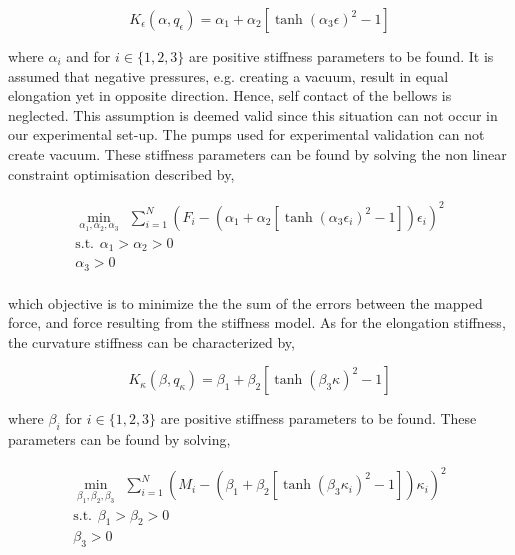 \begin{equation}
    K_\epsilon(\alpha,q_\epsilon) =  \alpha_1 + \alpha_2 [\tanh({\alpha_3 \epsilon})^2 -1]
\end{equation}


where $\alpha_i$ and  for $i \in \{1,2,3\} $ are positive stiffness parameters to be found. It is assumed that negative pressures, e.g. creating a vacuum, result in equal elongation yet in opposite direction. Hence, self contact of the bellows is neglected. This assumption is deemed valid since this situation can not occur in our experimental set-up. The pumps used for experimental validation can not create vacuum. These stiffness parameters can be found by solving the non linear constraint optimisation described by,


\begin{equation}
\begin{aligned}
\min_{\alpha_1,\alpha_2,\alpha_3} \hspace{5pt} \sum_{i=1}^{N}(F_i -  (\alpha_1 + \alpha_2 [\tanh({\alpha_3 \epsilon_i})^2 -1])\epsilon_i)^2    \\ 
\text{s.t.} \hspace{5pt} \alpha_1 > \alpha_2 > 0 \\
\alpha_3 > 0 \\ 
\label{eq3:Keopt}
\end{aligned}
\end{equation}

which objective is to minimize the the sum of the errors between the mapped force, and force resulting from the stiffness model. As for the elongation stiffness, the curvature stiffness can be characterized by,

\begin{equation}
    K_\kappa(\beta,q_\kappa) =  \beta_1 + \beta_2 [\tanh({\beta_3 \kappa})^2 -1]
\end{equation}


where $\beta_i$ for $i \in \{1,2,3\} $ are positive stiffness parameters to be found. These parameters can be found by solving,

\begin{equation}
\begin{aligned}
\min_{\beta_1,\beta_2,\beta_3} \hspace{5pt} \sum_{i=1}^{N}(M_i -  (\beta_1 + \beta_2 [\tanh({\beta_3 {\kappa_i}})^2 -1]){\kappa_i})^2    \\ 
\text{s.t.} \hspace{5pt} \beta_1 > \beta_2 > 0 \\
\beta_3 > 0 \\ 
\label{eq3:Kkopt}
\end{aligned}
\end{equation}



